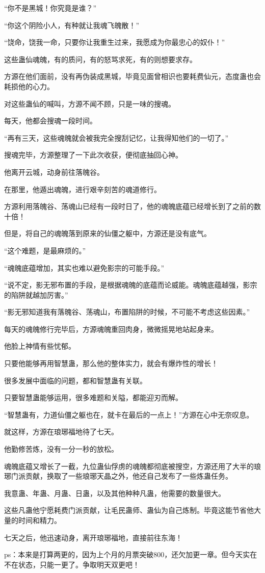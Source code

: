 \begin{this_body}
“你不是黑城！你究竟是谁？”

“你这个阴险小人，有种就让我魂飞魄散！”

“饶命，饶我一命，只要你让我重生过来，我愿成为你最忠心的奴仆！”

这些蛊仙魂魄，有的质问，有的怒骂求死，有的则想要求存。

方源在他们面前，没有再伪装成黑城，毕竟见面曾相识也要耗费仙元，态度蛊也会耗损他的心力。

对这些蛊仙的喊叫，方源不闻不顾，只是一味的搜魂。

每天，他都会搜魂一段时间。

“再有三天，这些魂魄就会被我完全搜刮记忆，让我得知他们的一切了。”

搜魂完毕，方源整理了一下此次收获，便彻底抽回心神。

他离开云城，动身前往落魄谷。

在那里，他遁出魂魄，进行艰辛刻苦的魂道修行。

方源利用落魄谷、荡魂山已经有一段时日了，他的魂魄底蕴已经增长到了之前的数十倍！

但是，将自己的魂魄落到原来的仙僵之躯中，方源还是没有底气。

“这个难题，是最麻烦的。”

“魂魄底蕴增加，其实也难以避免影宗的可能手段。”

“说不定，影无邪布置的手段，是根据魂魄的底蕴而论威能。魂魄底蕴越强，影宗的陷阱就越加厉害。”

“影无邪知道我有落魄谷、荡魂山，布置陷阱的时候，不可能不考虑这些因素。”

每天的魂魄修行完毕后，方源魂魄重回肉身，微微摇晃地站起身来。

他脸上神情有些忧郁。

只要他能够再用智慧蛊，那么他的整体实力，就会有爆炸性的增长！

很多发展中面临的问题，都和智慧蛊有关联。

只要智慧蛊能够运用，很多难题和关隘，都能迎刃而解。

“智慧蛊有，力道仙僵之躯也在，就卡在最后的一点上！”方源在心中无奈叹息。

就这样，方源在琅琊福地待了七天。

他勤修苦炼，没有一分一秒的放松。

魂魄底蕴又增长了一截，九位蛊仙俘虏的魂魄都彻底被搜空，方源还用了大半的琅琊门派贡献，换取了一些琅琊天晶之外，他还自己发布了一些炼蛊任务。

我意蛊、年蛊、月蛊、日蛊，以及其他种种凡蛊，他需要的数量很大。

这些凡蛊他宁愿耗费门派贡献，让毛民蛊师、蛊仙为自己炼制。毕竟这能节省他大量的时间和精力。

七天之后，他迅速动身，离开琅琊福地，直接前往东海！

ps：本来是打算两更的，因为上个月的月票突破800，还欠加更一章。但今天实在不在状态，只能一更了。争取明天双更吧！

\end{this_body}

